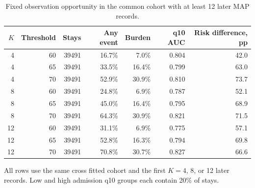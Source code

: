 \begin{table}[!htbp]
\caption{Fixed observation opportunity in the common cohort with at least 12 later MAP records.}
\label{tab:common_cohort_fixed_opportunity_thresholds}
\centering
\scriptsize
\begin{tabular}{rrrrrrr}
\hline
$K$ & Threshold & Stays & Any event & Burden & q10 AUC & Risk difference, pp\\
\hline
4 & 60 & 39491 & 16.7\% & 7.0\% & 0.804 & 42.0\\
4 & 65 & 39491 & 33.5\% & 16.4\% & 0.799 & 63.0\\
4 & 70 & 39491 & 52.9\% & 30.9\% & 0.810 & 73.7\\
8 & 60 & 39491 & 24.8\% & 6.9\% & 0.787 & 52.1\\
8 & 65 & 39491 & 45.0\% & 16.4\% & 0.795 & 68.9\\
8 & 70 & 39491 & 64.3\% & 30.9\% & 0.821 & 71.5\\
12 & 60 & 39491 & 31.1\% & 6.9\% & 0.775 & 57.1\\
12 & 65 & 39491 & 52.8\% & 16.3\% & 0.794 & 69.8\\
12 & 70 & 39491 & 70.8\% & 30.7\% & 0.827 & 66.6\\
\hline
\end{tabular}
\par\smallskip
\footnotesize{All rows use the same cross fitted cohort and the first $K=4$, 8, or 12 later records. Low and high admission q10 groups each contain 20\% of stays.}
\end{table}
